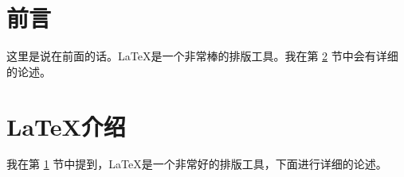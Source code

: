 \documentclass{ctexart}
\begin{document}
\tableofcontents
\section{前言}
\label{sec:introduction}
这里是说在前面的话。\LaTeX 是一个非常棒的排版工具。我在第 \ref{sec:detail} 节中会有详细的论述。
\section{\LaTeX 介绍}
\label{sec:detail}
我在第 \ref{sec:introduction} 节中提到，\LaTeX 是一个非常好的排版工具，下面进行详细的论述。
\end{document}
